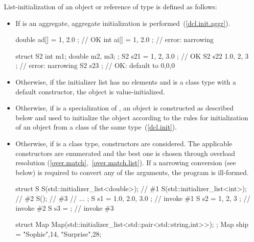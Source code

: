 \pnum
List-initialization of an object or reference of type  is defined as follows:
\begin{itemize}
\item If  is an aggregate, aggregate initialization is
performed~(\ref{dcl.init.aggr}).

\enterexample
\begin{codeblock}
double ad[] = { 1, 2.0 };           // OK
int ai[] = { 1, 2.0 };              // error: narrowing

struct S2 {
  int m1;
  double m2, m3;
};
S2 s21 = { 1, 2, 3.0 };             // OK
S2 s22 { 1.0, 2, 3 };               // error: narrowing
S2 s23 { };                         // OK: default to 0,0,0
\end{codeblock}
\exitexample

\item Otherwise, if the initializer list has no elements and  is a class type with a
default constructor, the object is value-initialized.

\item Otherwise, if  is a specialization of ,
an  object is constructed as described below and used to
initialize the object according to the rules for initialization of an object from a
class of the same type~(\ref{dcl.init}).

\item Otherwise, if  is a class type, constructors are considered.
The applicable constructors are enumerated and
the best one is chosen through overload resolution (\ref{over.match},~\ref{over.match.list}). If a narrowing
conversion (see below) is required to convert any of the arguments, the program is
ill-formed.

\enterexample
\begin{codeblock}
struct S {
  S(std::initializer_list<double>); // \#1
  S(std::initializer_list<int>);    // \#2
  S();                              // \#3
  // ...
};
S s1 = { 1.0, 2.0, 3.0 };           // invoke \#1
S s2 = { 1, 2, 3 };                 // invoke \#2
S s3 = { };                         // invoke \#3
\end{codeblock}
\exitexample

\enterexample
\begin{codeblock}
struct Map {
  Map(std::initializer_list<std::pair<std::string,int>>);
};
Map ship = {{"Sophie",14}, {"Surprise",28}};
\end{codeblock}
\exitexample


\end{itemize}
